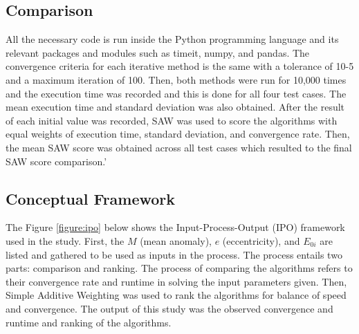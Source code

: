 \documentclass[a4paper,11pt]{article}
\begin{document}
\subsection{Comparison}
All the necessary code is run inside the Python programming language and its relevant packages and modules such as timeit, numpy, and pandas. The convergence criteria for each iterative method is the same with a tolerance of 10-5 and a maximum iteration of 100. Then, both methods were run for 10,000 times and the execution time was recorded and this is done for all four test cases. The mean execution time and standard deviation was also obtained.
After the result of each initial value was recorded, SAW was used to score the algorithms with equal weights of execution time,  standard deviation, and convergence rate. Then, the mean SAW score was obtained across all test cases which resulted to the final SAW score comparison.'

\subsection{Conceptual Framework}

The Figure \ref{figure:ipo} below shows the Input-Process-Output (IPO) framework used in the study. First, the $M$ (mean anomaly), $e$ (eccentricity), and $E_{0i}$ are listed and gathered to be used as inputs in the process. The process entails two parts: comparison and ranking. The process of comparing the algorithms refers to their convergence rate and runtime in solving the input parameters given. Then, Simple Additive Weighting was used to rank the algorithms for balance of speed and convergence. The output of this study was the observed convergence and runtime and ranking of the algorithms.
\end{document}
